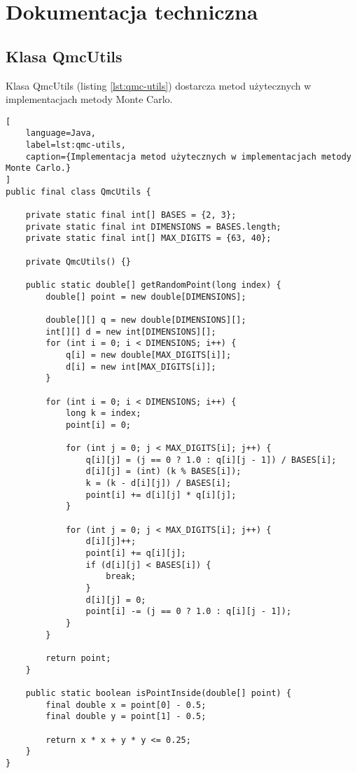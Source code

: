 \chapter{Dokumentacja techniczna} \label{ch:techdoc}

\section*{Klasa QmcUtils}

Klasa QmcUtils (listing \ref{lst:qmc-utils}) dostarcza metod użytecznych w implementacjach metody Monte Carlo.

\begin{lstlisting}[
    language=Java,
    label=lst:qmc-utils,
    caption={Implementacja metod użytecznych w implementacjach metody Monte Carlo.}
]
public final class QmcUtils {

    private static final int[] BASES = {2, 3};
    private static final int DIMENSIONS = BASES.length;
    private static final int[] MAX_DIGITS = {63, 40};

    private QmcUtils() {}

    public static double[] getRandomPoint(long index) {
        double[] point = new double[DIMENSIONS];

        double[][] q = new double[DIMENSIONS][];
        int[][] d = new int[DIMENSIONS][];
        for (int i = 0; i < DIMENSIONS; i++) {
            q[i] = new double[MAX_DIGITS[i]];
            d[i] = new int[MAX_DIGITS[i]];
        }

        for (int i = 0; i < DIMENSIONS; i++) {
            long k = index;
            point[i] = 0;

            for (int j = 0; j < MAX_DIGITS[i]; j++) {
                q[i][j] = (j == 0 ? 1.0 : q[i][j - 1]) / BASES[i];
                d[i][j] = (int) (k % BASES[i]);
                k = (k - d[i][j]) / BASES[i];
                point[i] += d[i][j] * q[i][j];
            }

            for (int j = 0; j < MAX_DIGITS[i]; j++) {
                d[i][j]++;
                point[i] += q[i][j];
                if (d[i][j] < BASES[i]) {
                    break;
                }
                d[i][j] = 0;
                point[i] -= (j == 0 ? 1.0 : q[i][j - 1]);
            }
        }

        return point;
    }

    public static boolean isPointInside(double[] point) {
        final double x = point[0] - 0.5;
        final double y = point[1] - 0.5;

        return x * x + y * y <= 0.25;
    }
}
\end{lstlisting}
\newpage


